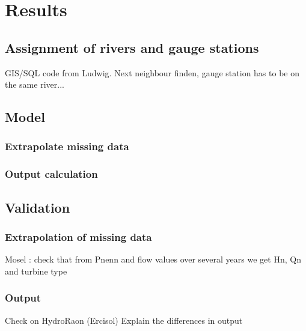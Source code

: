 \chapter{Results}


\section{Assignment of rivers and gauge stations}
GIS/SQL code from Ludwig. Next neighbour finden, gauge station has to be on the same river...

\section{Model}

\subsection{Extrapolate missing data}
\subsection{Output calculation}

\section{Validation}
\subsection{Extrapolation of missing data}
Mosel : check that from Pnenn and flow values over several years we get Hn, Qn and turbine type

\subsection{Output}
Check on HydroRaon (Ercisol) \newline
Explain the differences in output
